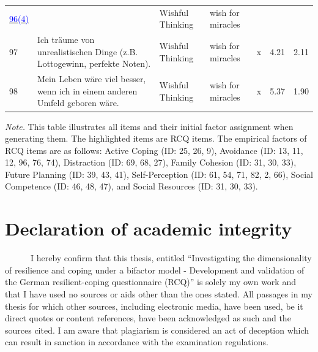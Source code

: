 \documentclass[
  man,floatsintext]{apa7}
\begin{document}
\begin{center}
\begin{ThreePartTable}
{\begin{longtable}{m{0.6cm}m{7.3cm}m{2.2cm}m{2.2cm}m{0.2cm}m{0.4cm}m{0.4cm}}
\label{wunsc_1_154_r}\hyperref[table1]{\textcolor{blue}{96(4)}} & \cellcolor{lightgray}{Ich denke  über Wunder (z.B. Lottogewinn, Spontanheilung) nach, welche meine Probleme lösen werden.} & Wishful Thinking & wish for miracles & \cellcolor{lightgray}{x} & \cellcolor{lightgray}{4.46} & \cellcolor{lightgray}{2.09}\\
97 & Ich träume von unrealistischen Dinge (z.B. Lottogewinn, perfekte Noten). & Wishful Thinking & wish for miracles & x & 4.21 & 2.11\\
98 & Mein Leben wäre viel besser, wenn ich in einem anderen Umfeld geboren wäre. & Wishful Thinking & wish for miracles & x & 5.37 & 1.90\\
\bottomrule
\end{longtable}

}

\end{ThreePartTable}
\end{center}

\vspace{-55pt}

\noindent  
\emph{Note.} This table illustrates all items and their initial factor assignment when generating them. The highlighted items are RCQ items. The empirical factors of RCQ items are as follows: Active Coping (ID: 25, 26, 9), Avoidance (ID: 13, 11, 12, 96, 76, 74), Distraction (ID: 69, 68, 27), Family Cohesion (ID: 31, 30, 33), Future Planning (ID: 39, 43, 41), Self-Perception (ID: 61, 54, 71, 82, 2, 66), Social Competence (ID: 46, 48, 47), and Social Resources (ID: 31, 30, 33). \normalsize \singlespacing \doublespacing \newpage

\section{Declaration of academic integrity}\label{declaration-of-academic-integrity}

~~~~~~I hereby confirm that this thesis, entitled ``Investigating the dimensionality of resilience and coping under a bifactor model - Development and validation of the German resilient-coping questionnaire (RCQ)'' is solely my own work and that I have used no sources or aids other than the ones stated. All passages in my thesis for which other sources, including electronic media, have been used, be it direct quotes or content references, have been acknowledged as such and the sources cited. I am aware that plagiarism is considered an act of deception which can result in sanction in accordance with the examination regulations.
\end{document}
